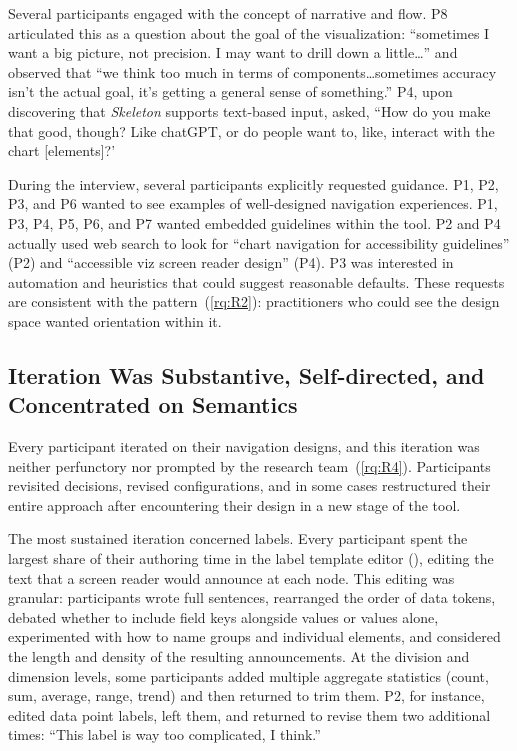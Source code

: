 \documentclass[12pt]{cmuthesis}
\begin{document}
Several participants engaged with the concept of narrative and flow. P8 articulated this as a question about the goal of the visualization: ``sometimes I want a big picture, not precision. I may want to drill down a little\ldots'' and observed that ``we think too much in terms of components\ldots sometimes accuracy isn't the actual goal, it's getting a general sense of something.'' P4, upon discovering that \textit{Skeleton} supports text-based input, asked, ``How do you make that good, though? Like chatGPT, or do people want to, like, interact with the chart [elements]?'

During the interview, several participants explicitly requested guidance. P1, P2, P3, and P6 wanted to see examples of well-designed navigation experiences. P1, P3, P4, P5, P6, and P7 wanted embedded guidelines within the tool. P2 and P4 actually used web search to look for ``chart navigation for accessibility guidelines'' (P2) and ``accessible viz screen reader design'' (P4). P3 was interested in automation and heuristics that could suggest reasonable defaults. These requests are consistent with the pattern~(\ref{rq:R2}): practitioners who could see the design space wanted orientation within it.

\subsection{Iteration Was Substantive, Self-directed, and Concentrated on Semantics}
\label{sec:results-iteration}

Every participant iterated on their navigation designs, and this iteration was neither perfunctory nor prompted by the research team~(\ref{rq:R4}). Participants revisited decisions, revised configurations, and in some cases restructured their entire approach after encountering their design in a new stage of the tool.

The most sustained iteration concerned labels. Every participant spent the largest share of their authoring time in the label template editor (), editing the text that a screen reader would announce at each node. This editing was granular: participants wrote full sentences, rearranged the order of data tokens, debated whether to include field keys alongside values or values alone, experimented with how to name groups and individual elements, and considered the length and density of the resulting announcements. At the division and dimension levels, some participants added multiple aggregate statistics (count, sum, average, range, trend) and then returned to trim them. P2, for instance, edited data point labels, left them, and returned to revise them two additional times: ``This label is way too complicated, I think.''
\end{document}
